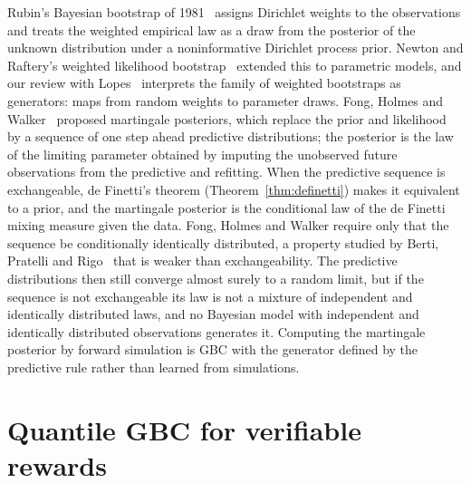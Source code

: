 Rubin's Bayesian bootstrap of 1981~\cite{rubin1981} assigns Dirichlet weights to the observations and treats the weighted empirical law as a draw from the posterior of the unknown distribution under a noninformative Dirichlet process prior. Newton and Raftery's weighted likelihood bootstrap~\cite{newtonraftery1994} extended this to parametric models, and our review with Lopes~\cite{weightedbootstrap2026} interprets the family of weighted bootstraps as generators: maps from random weights to parameter draws. Fong, Holmes and Walker~\cite{fongholmeswalker2023} proposed martingale posteriors, which replace the prior and likelihood by a sequence of one step ahead predictive distributions; the posterior is the law of the limiting parameter obtained by imputing the unobserved future observations from the predictive and refitting. When the predictive sequence is exchangeable, de Finetti's theorem (Theorem~\ref{thm:definetti}) makes it equivalent to a prior, and the martingale posterior is the conditional law of the de Finetti mixing measure given the data. Fong, Holmes and Walker require only that the sequence be conditionally identically distributed, a property studied by Berti, Pratelli and Rigo~\cite{berti2004} that is weaker than exchangeability. The predictive distributions then still converge almost surely to a random limit, but if the sequence is not exchangeable its law is not a mixture of independent and identically distributed laws, and no Bayesian model with independent and identically distributed observations generates it. Computing the martingale posterior by forward simulation is GBC with the generator defined by the predictive rule rather than learned from simulations.

\section{Quantile GBC for verifiable rewards}

